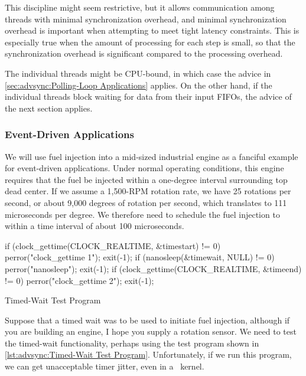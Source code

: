 This discipline might seem restrictive, but it allows communication
among threads with minimal synchronization overhead, and minimal
synchronization overhead is important when attempting to meet
tight latency constraints.
This is especially true when the amount of processing for each step
is small, so that the synchronization overhead is significant compared
to the processing overhead.

The individual threads might be CPU-bound, in which case the advice in
\cref{sec:advsync:Polling-Loop Applications} applies.
On the other hand, if the individual threads block waiting for
data from their input FIFOs, the advice of the next section applies.

\subsubsection{Event-Driven Applications}
\label{sec:advsync:Event-Driven Applications}

We will use fuel injection into a mid-sized industrial engine as a
fanciful example for event-driven applications.
Under normal operating conditions, this engine requires that the fuel
be injected within a one-degree interval surrounding top dead center.
If we assume a 1,500-RPM rotation rate, we have 25 rotations per second,
or about 9,000 degrees of rotation per second, which translates to
111 microseconds per degree.
We therefore need to schedule the fuel injection to within a time
interval of about 100 microseconds.

\begin{listing}
\begin{fcvlabel}
\begin{VerbatimL}
if (clock_gettime(CLOCK_REALTIME, &timestart) != 0) {
	perror("clock_gettime 1");
	exit(-1);
}
if (nanosleep(&timewait, NULL) != 0) {
	perror("nanosleep");
	exit(-1);
}
if (clock_gettime(CLOCK_REALTIME, &timeend) != 0) {
	perror("clock_gettime 2");
	exit(-1);
}
\end{VerbatimL}
\end{fcvlabel}
\caption{Timed-Wait Test Program}
\label{lst:advsync:Timed-Wait Test Program}
\end{listing}

Suppose that a timed wait was to be used to initiate fuel injection,
although if you are building an engine, I hope you supply a rotation
sensor.
We need to test the timed-wait functionality, perhaps using the test program
shown in
\cref{lst:advsync:Timed-Wait Test Program}.
Unfortunately, if we run this program, we can get unacceptable timer
jitter, even in a \rt\ kernel.

